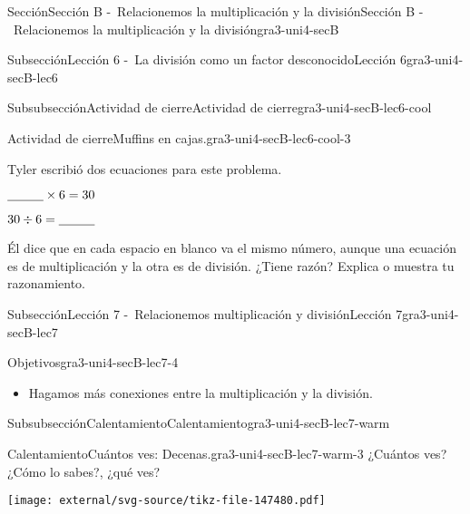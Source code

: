 \documentclass[twoside,14pt,]{extarticle}
\begin{document}
\begin{sectionptx}{Sección}{Sección B -~Relacionemos la multiplicación y la división}{}{Sección B -~Relacionemos la multiplicación y la división}{}{}{gra3-uni4-secB}
\begin{subsectionptx}{Subsección}{Lección 6 -~La división como un factor desconocido}{}{Lección 6}{}{}{gra3-uni4-secB-lec6}
\begin{subsubsectionptx}{Subsubsección}{Actividad de cierre}{}{Actividad de cierre}{}{}{gra3-uni4-secB-lec6-cool}
\begin{project}{Actividad de cierre}{Muffins en cajas.}{gra3-uni4-secB-lec6-cool-3}
\begin{sidebyside}{2}{0.05}{0.05}{0.1}
\begin{sbspanel}{0.4}%
Tyler escribió dos ecuaciones para este problema.%
\end{sbspanel}%
\begin{sbspanel}{0.4}%
\(\underline{\hspace{1 cm}} \times 6 = 30\)%
\par
\(30 \div 6 = \underline{\hspace{1 cm}}\)%
\end{sbspanel}%
\end{sidebyside}%
\par
Él dice que en cada espacio en blanco va el mismo número, aunque una ecuación es de multiplicación y la otra es de división. ¿Tiene razón? Explica o muestra tu razonamiento.%
\end{project}%
\end{subsubsectionptx}
\end{subsectionptx}
%
%
\typeout{************************************************}
\typeout{************************************************}
%
\begin{subsectionptx}{Subsección}{Lección 7 -~Relacionemos multiplicación y división}{}{Lección 7}{}{}{gra3-uni4-secB-lec7}
\begin{objectives}{Objetivos}{gra3-uni4-secB-lec7-4}
%
\begin{itemize}[label=\textbullet]
\item{}Hagamos más conexiones entre la multiplicación y la división.%
\end{itemize}
\end{objectives}
%
%
\typeout{************************************************}
\typeout{************************************************}
%
\begin{subsubsectionptx}{Subsubsección}{Calentamiento}{}{Calentamiento}{}{}{gra3-uni4-secB-lec7-warm}
\begin{exploration}{Calentamiento}{Cuántos ves: Decenas.}{gra3-uni4-secB-lec7-warm-3}%
¿Cuántos ves? ¿Cómo lo sabes?, ¿qué ves?%
\begin{image}{0}{1}{0}{}%
\texttt{[image: external/svg-source/tikz-file-147480.pdf]}
\end{image}%
\end{exploration}%
\end{subsubsectionptx}
%
%
\typeout{************************************************}

\end{subsectionptx}
\end{sectionptx}
\end{document}
